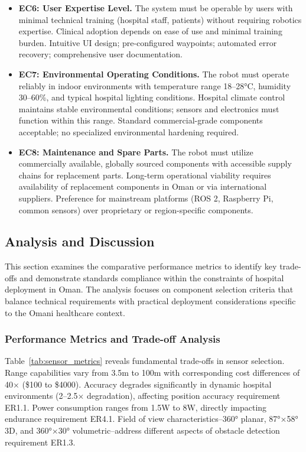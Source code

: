 \begin{itemize}
    \item \textbf{EC6: User Expertise Level.} The system must be operable by users with minimal technical training (hospital staff, patients) without requiring robotics expertise. Clinical adoption depends on ease of use and minimal training burden. Intuitive UI design; pre-configured waypoints; automated error recovery; comprehensive user documentation.
    
    \item \textbf{EC7: Environmental Operating Conditions.} The robot must operate reliably in indoor environments with temperature range 18--28°C, humidity 30--60\%, and typical hospital lighting conditions. Hospital climate control maintains stable environmental conditions; sensors and electronics must function within this range. Standard commercial-grade components acceptable; no specialized environmental hardening required.
    
    \item \textbf{EC8: Maintenance and Spare Parts.} The robot must utilize commercially available, globally sourced components with accessible supply chains for replacement parts. Long-term operational viability requires availability of replacement components in Oman or via international suppliers. Preference for mainstream platforms (ROS 2, Raspberry Pi, common sensors) over proprietary or region-specific components.
\end{itemize}

\subsection{Analysis and Discussion}

This section examines the comparative performance metrics to identify key trade-offs and demonstrate standards compliance within the constraints of hospital deployment in Oman. The analysis focuses on component selection criteria that balance technical requirements with practical deployment considerations specific to the Omani healthcare context.

\subsubsection{Performance Metrics and Trade-off Analysis}

Table~\ref{tab:sensor_metrics} reveals fundamental trade-offs in sensor selection. Range capabilities vary from 3.5m to 100m with corresponding cost differences of 40$\times$ (\$100 to \$4000). Accuracy degrades significantly in dynamic hospital environments (2--2.5$\times$ degradation), affecting position accuracy requirement ER1.1. Power consumption ranges from 1.5W to 8W, directly impacting endurance requirement ER4.1. Field of view characteristics--360° planar, 87°$\times$58° 3D, and 360°$\times$30° volumetric--address different aspects of obstacle detection requirement ER1.3.

